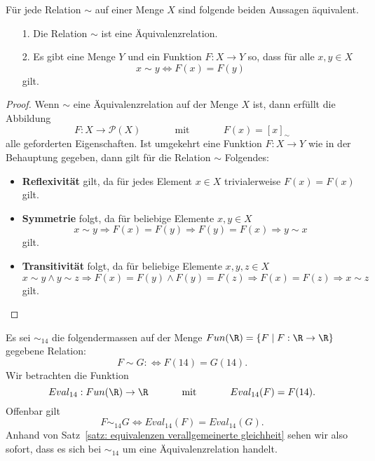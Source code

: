 \begin{satz}\label{satz: equivalenzen verallgemeinerte gleichheit}
Für jede Relation $\sim$ auf einer Menge $X$ sind folgende beiden Aussagen äquivalent.
\begin{enumerate}
\item[1.] Die Relation $\sim$ ist eine Äquivalenzrelation.
\item[2.] Es gibt eine Menge $Y$ und ein Funktion $F:X\to Y$ so, dass für alle $x,y\in X$
\[
x\sim y\Leftrightarrow F(x)=F(y)
\]
gilt.
\end{enumerate}
\end{satz}
\begin{proof}
Wenn $\sim$ eine Äquivalenzrelation auf der Menge $X$ ist, dann erfüllt die Abbildung
\[
F:X\to\mathcal{P}(X)\phantom{abstand}\text{mit} \phantom{abstand} F(x)=[x]_\sim
\]
alle geforderten Eigenschaften. Ist umgekehrt eine Funktion $F:X\to Y$ wie in der Behauptung gegeben, dann gilt für die Relation $\sim$ Folgendes:
\begin{itemize}
\item\textbf{Reflexivität} gilt, da für jedes Element $x\in X$ trivialerweise $F(x)=F(x)$ gilt.
\item \textbf{Symmetrie} folgt, da für beliebige Elemente $x,y\in X$
\[
x\sim y\Rightarrow F(x)=F(y)\Rightarrow F(y)=F(x)\Rightarrow y\sim x
\]
gilt.
\item\textbf{Transitivität} folgt, da für beliebige Elemente $x,y,z\in X$
\[
x\sim y\land y\sim z\Rightarrow F(x)=F(y)\land F(y)=F(z)\Rightarrow F(x)=F(z)\Rightarrow  x\sim z
\]
gilt.
\end{itemize}
\end{proof}



\begin{bsp}
Es sei $\sim_{14}$ die folgendermassen auf der Menge $Fun(\R)=\{F\mid F:\R\to\R\}$ gegebene Relation:
\[
F\sim G:\Leftrightarrow F(14)=G(14).
\]
Wir betrachten die Funktion
\[
Eval_{14}:Fun(\R)\to \R\phantom{abstand}\text{mit}\phantom{abstand}Eval_{14}(F)=F(14).
\]
Offenbar gilt
\[
F\sim_{14}G\Leftrightarrow Eval_{14}(F)=Eval_{14}(G).
\]
Anhand von Satz~\ref{satz: equivalenzen verallgemeinerte gleichheit} sehen wir also sofort, dass es sich bei $\sim_{14}$ um eine Äquivalenzrelation handelt.
\end{bsp}


